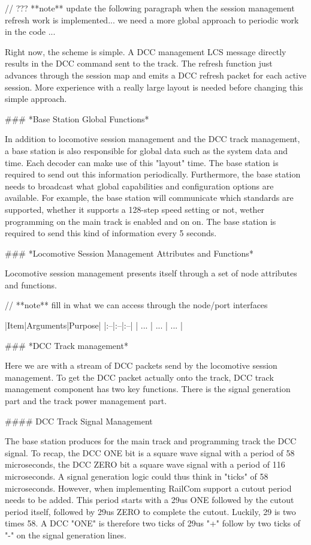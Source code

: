 // ??? **note** update the following paragraph when the session management refresh work is implemented... we need a more global approach to periodic work in the code ...

Right now, the scheme is simple. A DCC management LCS message directly results in the DCC command sent to the track. The refresh function just advances through the session map and emits a DCC refresh packet for each active session. More experience with a really large layout is needed before changing this simple approach.

### *Base Station Global Functions*

In addition to locomotive session management and the DCC track management, a base station is also responsible for global data such as the system data and time. Each decoder can make use of this "layout" time. The base station is required to send out this information periodically. Furthermore, the base station needs to broadcast what global capabilities and configuration options are available. For example, the base station will communicate which standards are supported, whether it supports a 128-step speed setting or not, wether  programming on the main track is enabled and on on. The base station is required to send this kind of information every 5 seconds.

### *Locomotive Session Management Attributes and Functions*

Locomotive session management presents itself through a set of node attributes and functions.

// **note** fill in what we can access through the node/port interfaces

|Item|Arguments|Purpose|
|:--|:--|:--|
| ... | ... | ... |

### *DCC Track management*

Here we are with a stream of DCC packets send by the locomotive session management. To get the DCC packet actually onto the track, DCC track management component has two key functions. There is the signal generation part and the track power management part.

#### DCC Track Signal Management

The base station produces for the main track and programming track the DCC signal. To recap, the DCC ONE bit is a square wave signal with a period of 58 microseconds, the DCC ZERO bit a square wave signal with a period of 116 microseconds. A signal generation logic could thus think in "ticks" of 58 microseconds. However, when implementing RailCom support a cutout period needs to be added. This period starts with a 29us ONE followed by the cutout period itself, followed by 29us ZERO to complete the cutout. Luckily, 29 is two times 58. A DCC "ONE" is therefore two ticks of 29us "+" follow by two ticks of "-" on the signal generation lines.

